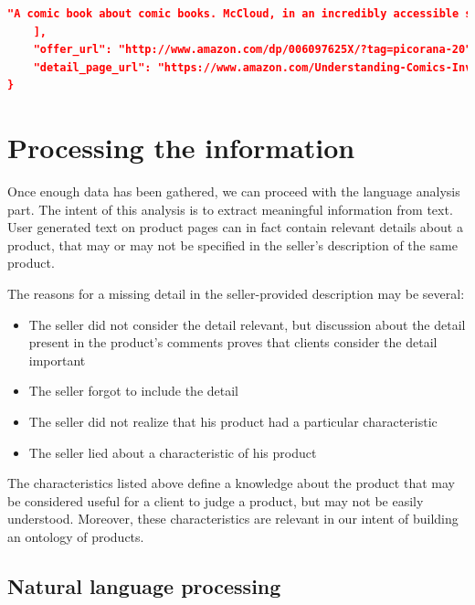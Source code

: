 \documentclass[LaM,oneside,binding=0.6cm]{sapthesis}
\begin{document}
\begin{lstlisting}[language=json,firstnumber=1]
        "A comic book about comic books. McCloud, in an incredibly accessible style, explains the details of how comics work: how they're composed, read and understood. More than just a book about comics, this gets to the heart of how we deal with visual languages in general. \"The potential of comics is limitless and exciting!\" writes McCloud. This should be required reading for every school teacher. Pulitzer Prize-winner Art Spiegelman says, \"The most intelligent comics I've seen in a long time.\""
    ], 
    "offer_url": "http://www.amazon.com/dp/006097625X/?tag=picorana-20", 
    "detail_page_url": "https://www.amazon.com/Understanding-Comics-Invisible-Scott-McCloud/dp/006097625X?SubscriptionId=AKIAIRCSTDTCOYE3OA6Q&tag=picorana-20&linkCode=xm2&camp=2025&creative=165953&creativeASIN=006097625X"
}
\end{lstlisting}


\chapter{Processing the information}

Once enough data has been gathered, we can proceed with the language analysis part.
The intent of this analysis is to extract meaningful information from text. User generated text on product pages can in fact contain relevant details about a product, that may or may not be specified in the seller's description of the same product. 

The reasons for a missing detail in the seller-provided description may be several:
\begin{itemize}
	\item The seller did not consider the detail relevant, but discussion about the detail present in the product's comments proves that clients consider the detail important
	\item The seller forgot to include the detail
	\item The seller did not realize that his product had a particular characteristic
	\item The seller lied about a characteristic of his product
\end{itemize}

The characteristics listed above define a knowledge about the product that may be considered useful for a client to judge a product, but may not be easily understood. Moreover, these characteristics are relevant in our intent of building an ontology of products.

\section{Natural language processing}
\end{document}
